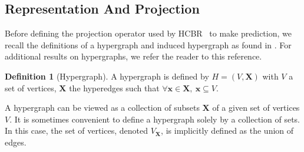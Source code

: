 \documentclass[preprint,12pt]{elsarticle}
\def\HCBR{{\sc HCBR}}
\theoremstyle{definition}
\newtheorem{definition}{Definition}[section]
\begin{document}
\subsection{Representation And Projection}
\label{sec:rep}

Before defining the projection operator used by \HCBR~ to make prediction, we recall the definitions of a hypergraph and induced hypergraph as found in \cite{berge1984hypergraphs}. For additional results on hypergraphs, we refer the reader to this reference.

\begin{definition}[Hypergraph]
A hypergraph is defined by $H = (V, \mathbf{X})$ with $V$ a set of vertices, $\mathbf{X}$ the hyperedges such that $\forall \mathbf{x} \in \mathbf{X}, ~ \mathbf{x} \subseteq V$.
\end{definition}
\noindent
A hypergraph can be viewed as a collection of subsets $\mathbf{X}$ of a given set of vertices $V$. It is sometimes convenient to define a hypergraph solely by a collection of sets. In this case, the set of vertices, denoted $V_\mathbf{X}$, is implicitly defined as the union of edges.
\end{document}
